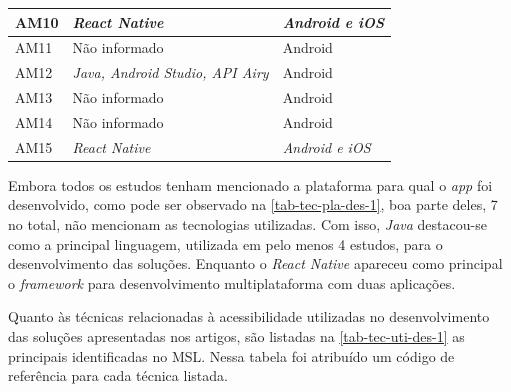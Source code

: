\begin{table}[htb]
\begin{center}
\begin{tabular}{p{1.0cm}|p{8.0cm}|p{3.0cm}}
            \hline
            AM10            & \emph{React Native}                                              & \emph{Android e iOS} \\
            \hline
            AM11            & Não informado                                                    & Android       \\
            \hline
            AM12            & \emph{Java, Android Studio, API Airy}                            & Android       \\
            \hline
            AM13            & Não informado                                                    & Android       \\
            \hline
            AM14            & Não informado                                                    & Android       \\
            \hline
            AM15            & \emph{React Native}                                              & \emph{Android e iOS} \\
        \end{tabular}
    \end{center}
\end{table}

Embora todos os estudos tenham mencionado a plataforma para qual o \emph{app} foi desenvolvido,
como pode ser observado na \autoref{tab-tec-pla-des-1}, boa parte deles, 7 no total, não mencionam as tecnologias utilizadas.
Com isso, \emph{Java} destacou-se como a principal linguagem, utilizada em pelo menos 4 estudos, para o desenvolvimento das soluções.
Enquanto o \emph{React Native} apareceu como principal o \emph{framework} para desenvolvimento multiplataforma com duas aplicações.

\newpage

Quanto às técnicas relacionadas à acessibilidade utilizadas no desenvolvimento das soluções apresentadas nos artigos, são listadas
na \autoref{tab-tec-uti-des-1} as principais identificadas no MSL\@.
Nessa tabela foi atribuído um código de referência para cada técnica listada.

